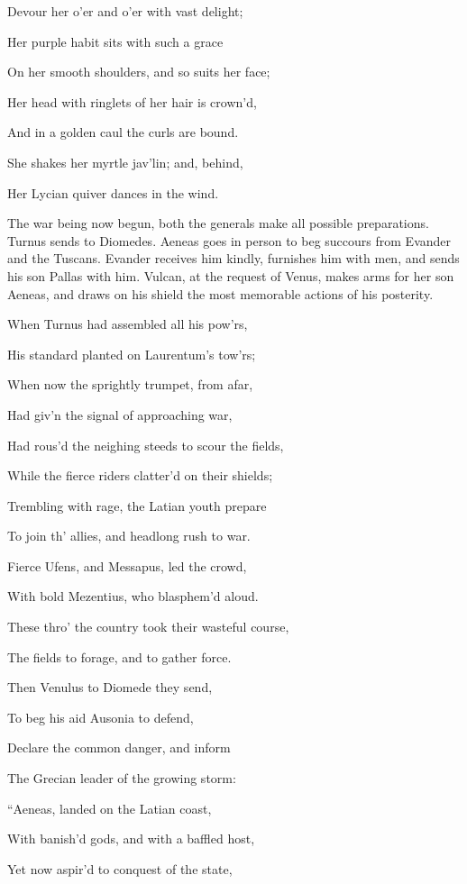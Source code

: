 Devour her o’er and o’er with vast delight;

Her purple habit sits with such a grace

On her smooth shoulders, and so suits her face;

Her head with ringlets of her hair is crown’d,

And in a golden caul the curls are bound.

She shakes her myrtle jav’lin; and, behind,

Her Lycian quiver dances in the wind.


The war being now begun, both the generals make all possible preparations.
Turnus sends to Diomedes. Aeneas goes in person to beg succours from Evander
and the Tuscans. Evander receives him kindly, furnishes him with men, and
sends his son Pallas with him. Vulcan, at the request of Venus, makes arms
for her son Aeneas, and draws on his shield the most memorable actions of
his posterity.

When Turnus had assembled all his pow’rs,

His standard planted on Laurentum’s tow’rs;

When now the sprightly trumpet, from afar,

Had giv’n the signal of approaching war,

Had rous’d the neighing steeds to scour the fields,

While the fierce riders clatter’d on their shields;

Trembling with rage, the Latian youth prepare

To join th’ allies, and headlong rush to war.

Fierce Ufens, and Messapus, led the crowd,

With bold Mezentius, who blasphem’d aloud.

These thro’ the country took their wasteful course,

The fields to forage, and to gather force.

Then Venulus to Diomede they send,

To beg his aid Ausonia to defend,

Declare the common danger, and inform

The Grecian leader of the growing storm:

“Aeneas, landed on the Latian coast,

With banish’d gods, and with a baffled host,

Yet now aspir’d to conquest of the state,

